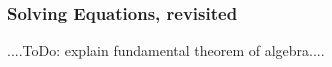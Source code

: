











\subsubsection{Solving Equations, revisited}
....ToDo: explain fundamental theorem of algebra....

